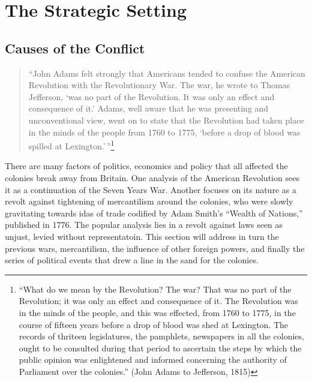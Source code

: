 \newpage
\section{The Strategic Setting}

\subsection{Causes of the Conflict}


\begin{quote}
  ``John Adams felt strongly that Americans tended to confuse the American 
  Revolution with the Revolutionary War. The war, he wrote to Thomas Jefferson,
  `was no part of the Revolution. It was only an effect and consequence of it.'
  Adams, well aware that he was presenting and unconventional view, went on to
  state that the Revolution had taken place in the minds of the people from 1760
  to 1775, `before a drop of blood was spilled at
  Lexington.'\,''\cite[15]{dupuy_1977}\footnote{``What do we mean by the
  Revolution? The war? That was no part of the Revolution; it was only an effect
  and consequence of it. The Revolution was in the minds of the people, and this
  was effected, from 1760 to 1775, in the course of fifteen years before a drop
  of blood was shed at Lexington. The records of thriteen legislatures, the
  pamphlets, newspapers in all the colonies, ought to be consulted during that
  period to ascertain the steps by which the public opinion was enlightened and
  informed concerning the authority of Parliament over the colonies.'' (John Adams
  to Jefferson, 1815)}

\end{quote}

There are many factors of politics, economics and policy that all affected the
colonies break away from Britain. One analysis of the American Revolution sees it
as a continuation of the Seven Years War. Another focuses on its nature as a
revolt against tightening of mercantilism around the colonies, who were slowly
gravitating towards idas of trade codified by Adam Smith's ``Wealth of
Nations,'' published in 1776. The popular analysis lies in a revolt
against laws seen as unjust, levied without representatoin. This section will
address in turn the previous wars, mercantilism, the influence of other foreign
powers, and finally the series of political events that drew a line in the sand
for the colonies.

